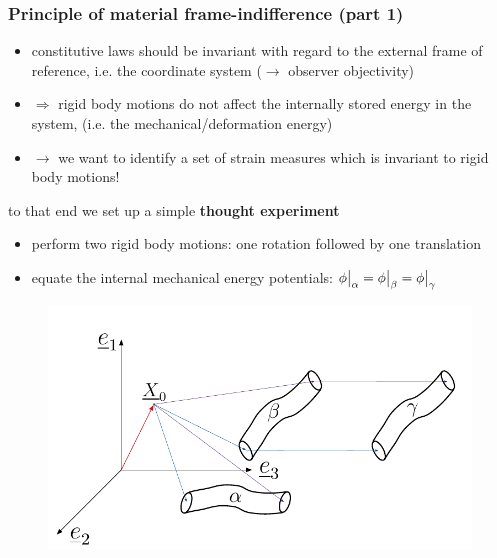 \begin{frame}
  \frametitle{Principle of material frame-indifference (part 1)}

  \vspace{-0.5em}
  \begin{itemize}
    \item  constitutive laws should be invariant with regard to the external frame of reference, \newline i.e. the coordinate system ($\rightarrow$ observer objectivity)
    \item $\Rightarrow$ rigid body motions do not affect the internally stored energy in the system, \newline \null \quad (i.e. the mechanical/deformation energy)
    \item $\rightarrow$ we want to identify a set of strain measures which is invariant to rigid body motions!
  \end{itemize}
  
  \vspace{0.3em}
  to that end we set up a simple \textbf{thought experiment}
  \begin{itemize}
    \item perform two rigid body motions: one rotation followed by one translation
    \item equate the internal mechanical energy potentials: $\eval[1]{\phi}_{\alpha} = \eval[1]{\phi}_{\beta} = \eval[1]{\phi}_{\gamma}$
  \end{itemize}
  
  \vspace{-1.4em}
  \begin{figure}
    \centering
    \includegraphics[width=13cm, keepaspectratio=true]{sections/cosserat_rods/images/FrameIndifferenceExperiment}
  \end{figure}  
\end{frame}



